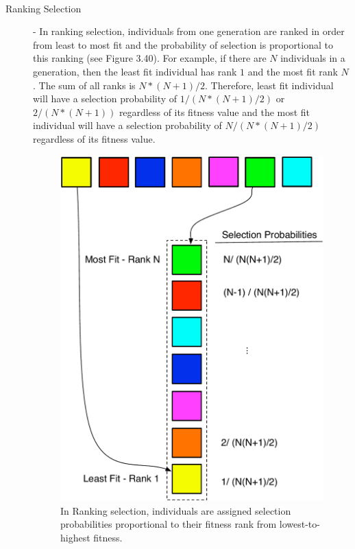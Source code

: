 \documentclass[a4paper,12pt]{report} 	%
\numberwithin{figure}{chapter}
\numberwithin{table}{chapter}
\numberwithin{equation}{chapter}
\begin{document}
\begin{flushleft}
\begin{description}
\\
\item [Ranking Selection] - In ranking selection, individuals from one generation are ranked in order from least to most fit and the probability of selection is proportional to this ranking (see Figure 3.40). For example, if there are $N$ individuals in a generation, then the least fit individual has rank $1$ and the most fit rank $N$. The sum of all ranks is $N*(N+1)/2$. Therefore, least fit individual will have a selection probability of $1/(N*(N+1)/2)$ or $2/(N*(N+1))$ regardless of its fitness value and the most fit individual will have a selection probability of $N/(N*(N+1)/2)$ regardless of its fitness value. 
\begin{figure}[h!]
\begin{center}
\includegraphics[scale = 0.6]{RankSelection}
\caption[Ranking Selection]{In Ranking selection, individuals are assigned selection probabilities proportional to their fitness rank from lowest-to-highest fitness.}

\end{center}
\end{figure}
\end{description}
\end{flushleft}
\end{document}
